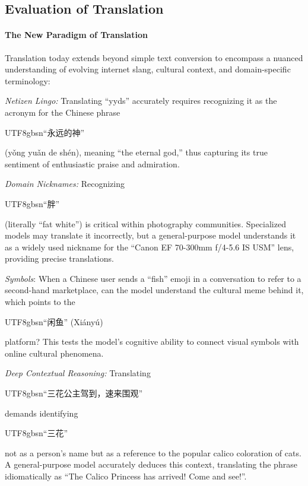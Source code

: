 \documentclass{article}
\theoremstyle{definition}
\begin{document}
\subsection{Evaluation of Translation}

\paragraph{The New Paradigm of Translation} Translation today extends beyond simple text conversion to encompass a nuanced understanding of evolving internet slang, cultural context, and domain-specific terminology:

\textit{Netizen Lingo:} Translating ``yyds'' accurately requires recognizing it as the acronym for the Chinese phrase \begin{CJK*}{UTF8}{gbsn}``永远的神''\end{CJK*} (yǒng yuǎn de shén), meaning ``the eternal god,'' thus capturing its true sentiment of enthusiastic praise and admiration.

\textit{Domain Nicknames:} Recognizing \begin{CJK*}{UTF8}{gbsn}``胖''\end{CJK*} (literally ``fat white'') is critical within photography communities. Specialized models may translate it incorrectly, but a general-purpose model understands it as a widely used nickname for the ``Canon EF 70-300mm f/4-5.6 IS USM'' lens, providing precise translations.

\textit{Symbols}: When a Chinese user sends a ``fish'' emoji in a conversation to refer to a second-hand marketplace, can the model understand the cultural meme behind it, which points to the \begin{CJK*}{UTF8}{gbsn}``闲鱼'' (Xiányú)\end{CJK*} platform? This tests the model's cognitive ability to connect visual symbols with online cultural phenomena.

\textit{Deep Contextual Reasoning:} Translating \begin{CJK*}{UTF8}{gbsn}``三花公主驾到，速来围观''\end{CJK*} demands identifying \begin{CJK*}{UTF8}{gbsn}``三花''\end{CJK*} not as a person's name but as a reference to the popular calico coloration of cats. A general-purpose model accurately deduces this context, translating the phrase idiomatically as ``The Calico Princess has arrived! Come and see!''.
\end{document}
